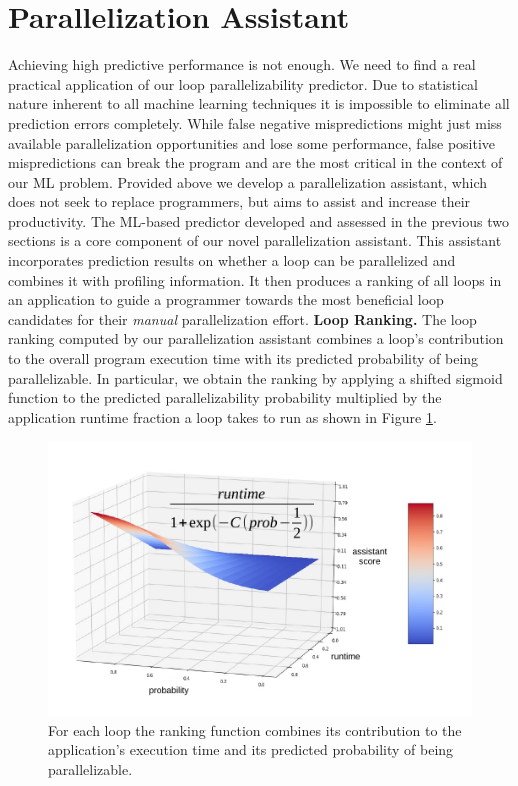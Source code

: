 \section{Parallelization Assistant}
\label{practical_applications}
\quad Achieving high predictive performance is not enough. We need to find a real practical application of our loop parallelizability predictor. Due to statistical nature inherent to all machine learning techniques it is impossible to eliminate all prediction errors completely. While false negative mispredictions might just miss available parallelization opportunities and lose some performance, false positive mispredictions can break the program and are the most critical in the context of our ML problem.\newlibe\null
\quad Provided above we develop a parallelization assistant, which does not seek to replace programmers, but aims to assist and increase their productivity. The ML-based predictor developed and assessed in the previous two sections is a core component of our novel parallelization assistant. This assistant incorporates prediction results on whether a loop can be parallelized and combines it with profiling information. It then produces a ranking of all loops in an application to guide a programmer towards the most beneficial loop candidates for their \textit{manual} parallelization effort.\newline\null 
\quad \textbf{Loop Ranking.} The loop ranking computed by our parallelization assistant combines a loop's contribution to the overall program execution time with its predicted probability of being parallelizable. In particular, we obtain the ranking by applying a shifted sigmoid function to the predicted parallelizability probability multiplied by the application runtime fraction a loop takes to run as shown in Figure \ref{fig:sigmoid_3d}.
\begin{figure}[ht]
\includegraphics[width=1.0\textwidth]{images/product_func.pdf}
\caption{For each loop the ranking function combines its contribution to the application's execution time and its predicted probability of being parallelizable.}
\label{fig:sigmoid_3d}
\end{figure}
